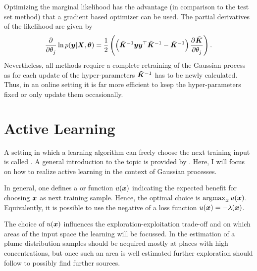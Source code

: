 Optimizing the marginal likelihood has the advantage (in comparison to the test 
set method) that a gradient based optimizer can be used. The partial derivatives 
of the likelihood are given by
\begin{equation}
    \dpd{}{\theta_j} \ln p(\vc y | \mat X, \vc\theta) = \frac{1}{2} 
    \del{\del{\tilde{\mat K}^{-1}\vc y \vc y\Tr \tilde{\mat K}^{-1} 
            - \tilde{\mat{K}}^{-1}} \dpd{\tilde{\mat K}}{\theta_j}} \text{.}
\end{equation}
Nevertheless, all methods require a complete retraining of the Gaussian process 
as for each update of the hyper-parameters $\tilde{\bm{K}}^{-1}$ has to be newly 
calculated.  Thus, in an online setting it is far more efficient to keep the 
hyper-parameters fixed or only update them occasionally.

\section{Active Learning}\label{sec:utility}
A setting in which a learning algorithm can freely choose the next training 
input is called . A general introduction to the topic 
is provided by \textcite{Settles:2009vo}. Here, I will focus on how to realize 
active learning in the context of Gaussian processes.

In general, one defines a  or  function 
$u(\bm{x})$ indicating the expected benefit for choosing $\bm{x}$ as next training 
sample. Hence, the optimal choice is $\operatorname*{argmax}_{\bm{x}} u(\bm{x})$. Equivalently, 
it is possible to use the negative of a loss function $u(\bm{x}) = - \lambda(\bm{x})$.

The choice of $u(\bm{x})$ influences the exploration-exploitation trade-off and 
on which areas of the input space the learning will be focussed. In the 
estimation of a plume distribution samples should be acquired mostly at places 
with high concentrations, but once such an area is well estimated further 
exploration should follow to possibly find further sources.

